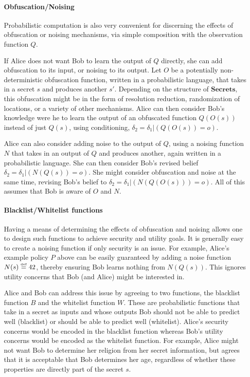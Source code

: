 \documentclass{article} %
\newcommand{\secrets}[0]{\textbf{Secrets}}
\newcommand{\paren}[1]{\left( #1 \right)}
\newcommand{\cond}[0]{|}
\newcommand{\stacklabel}[1]{\stackrel{\smash{\scriptscriptstyle \mathrm{#1}}}}
\newcommand{\defeq}{\stacklabel{def}=}
\theoremstyle{plain} %
\theoremstyle{definition} %
\begin{document}
\paragraph*{Obfuscation/Noising} Probabilistic computation is also very
convenient for discerning the effects of obfuscation or noising
mechanisms, via simple composition with the observation function $ Q
$.

If Alice does not want Bob to learn the output of $ Q $ directly, she
can add obfuscation to its input, or noising to its output. Let $ O $
be a potentially non-deterministic obfuscation function, written in a
probabilistic language, that takes in a secret $ s $ and produces
another $ s' $. Depending on the structure of $ \secrets $, this
obfuscation might be in the form of resolution reduction,
randomization of locations, or a variety of other mechanisms. Alice
can then consider Bob's knowledge were he to learn the output of an
obfuscated function $ Q(O(s)) $ instead of just $ Q(s) $, using
conditioning, $ \delta_2 = \delta_1 \cond \paren{Q(O(s)) = o} $.

Alice can also consider adding noise to the output of $ Q $, using a
noising function $ N $ that takes in an output of $ Q $ and produces
another, again written in a probabilistic language. She can then
consider Bob's revised belief $ \delta_2 = \delta_1 \cond
\paren{N(Q(s)) = o} $. She might consider obfuscation and noise at the
same time, revising Bob's belief to $ \delta_2 = \delta_1 \cond
\paren{N(Q(O(s))) = o} $. All of this assumes that Bob is aware of $ O
$ and $ N $.

\paragraph*{Blacklist/Whitelist functions} Having a means of
determining the effects of obfuscation and noising allows one to
design such functions to achieve security and utility goals. It is
generally easy to create a noising function if only security is an
issue. For example, Alice's example policy $ P $ above can be easily
guaranteed by adding a noise function $ N(s) \defeq 42 $,
thereby ensuring Bob learns nothing from $ N(Q(s)) $. This ignores
utility concerns that Bob (and Alice) might be interested in.

Alice and Bob can address this issue by agreeing to two functions, the
blacklist function $ B $ and the whitelist function $ W $. These are
probabilistic functions that take in a secret as inputs and whose
outputs Bob should not be able to predict well (blacklist) or should
be able to predict well (whitelist). Alice's security concerns would
be encoded in the blacklist function whereas Bob's utility concerns
would be encoded as the whitelist function. For example, Alice might
not want Bob to determine her religion from her secret information,
but agrees that it is acceptable that Bob determines her age,
regardless of whether these properties are directly part of the secret
$ s $.
\end{document}
